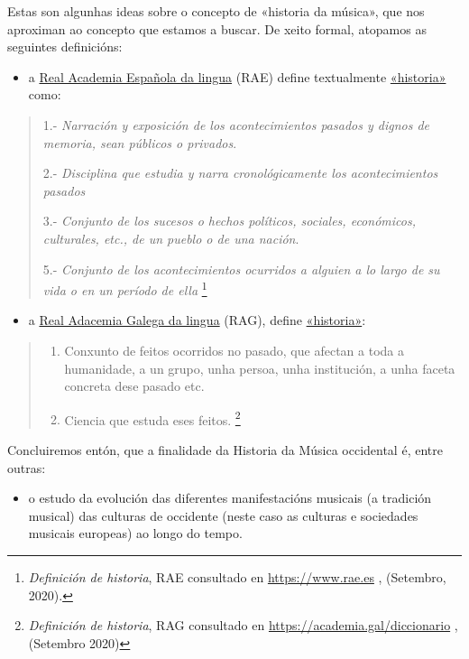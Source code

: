\documentclass[a4paper, twoside]{templates/ociamthesis}
\providecommand{\tightlist}{%
  \setlength{\itemsep}{0pt}\setlength{\parskip}{0pt}}
\theoremstyle{definition}
\theoremstyle{definition}
\theoremstyle{definition}
\theoremstyle{definition}
\theoremstyle{remark}
\begin{document}
Estas son algunhas ideas sobre o concepto de «historia da música», que nos aproximan ao concepto que estamos a buscar. De xeito formal, atopamos as seguintes definicións:

\begin{itemize}
\tightlist
\item
  a \href{https://dle.rae.es/}{Real Academia Española da lingua} (RAE) define textualmente \href{https://dle.rae.es/historia\#otras}{«historia»} como:
\end{itemize}

\begin{quote}
1.- \emph{Narración y exposición de los acontecimientos pasados y dignos de memoria, sean públicos o privados}.

2.- \emph{Disciplina que estudia y narra cronológicamente los acontecimientos pasados}

3.- \emph{Conjunto de los sucesos o hechos políticos, sociales, económicos, culturales, etc., de un pueblo o de una nación}.

5.- \emph{Conjunto de los acontecimientos ocurridos a alguien a lo largo de su vida o en un período de ella} \footnote{\emph{Definición de historia}, RAE consultado en \url{https://www.rae.es} , (Setembro, 2020).}
\end{quote}

\begin{itemize}
\tightlist
\item
  a \href{https://academia.gal/dicionario}{Real Adacemia Galega da lingua} (RAG), define \href{https://academia.gal/dicionario/-/termo/busca/Historia}{«historia»}:
\end{itemize}

\begin{quote}
\begin{enumerate}
\def\labelenumi{\arabic{enumi}.}
\item
  Conxunto de feitos ocorridos no pasado, que afectan a toda a humanidade, a un grupo, unha persoa, unha institución, a unha faceta concreta dese pasado etc.
\item
  Ciencia que estuda eses feitos. \footnote{\emph{Definición de historia}, RAG consultado en \url{https://academia.gal/diccionario} , (Setembro 2020)}
\end{enumerate}
\end{quote}

Concluiremos entón, que a finalidade da Historia da Música occidental é, entre outras:

\begin{correction}
\begin{itemize}
\tightlist
\item
  o estudo da evolución das diferentes manifestacións musicais (a
  tradición musical) das culturas de occidente (neste caso as culturas e
  sociedades musicais europeas) ao longo do tempo.
\end{itemize}
\end{correction}
\end{document}
